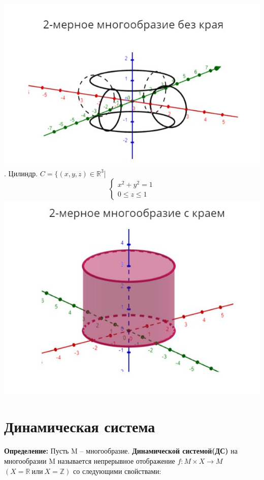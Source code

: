 \documentclass[12pt,a4paper]{article}
\begin{document}
\includegraphics[scale=0.5]{image4.jpg}
. Цилиндр.
\newline \(C = \{(x,y,z)\in \mathbb{R}^3\)|
\begin{equation*}
\begin{cases}
x^2+y^2=1
\\
0\leq z\leq1 
\end{cases}
\end{equation*}
\includegraphics[scale=0.5]{image5.jpg}
\newpage

\section*{Динамическая система}

\textbf{\large{Определение:}} Пусть M -- многообразие. \textbf{Динамической системой(ДС)} 
на многообразии M называется непрерывное отображение $f:M\times X \rightarrow M~$ $(X = \mathbb{R}~ \textit{или}~ X = \mathbb{Z})$ со следующими свойствами:
\end{document}
